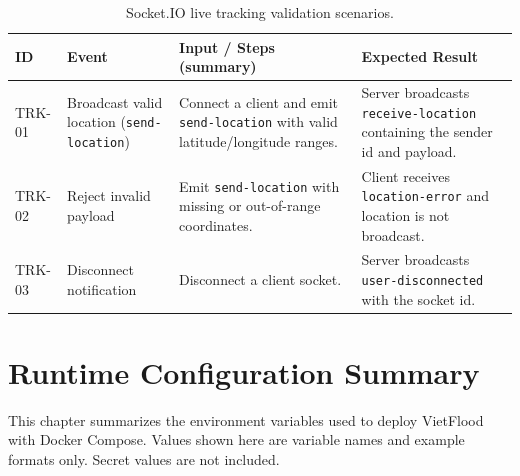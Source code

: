 \begin{table}[H]
\centering
\caption{Socket.IO live tracking validation scenarios.}
\label{tab:appendix-tracking-test-cases}
\renewcommand{\arraystretch}{1.15}
\scriptsize
\setlength{\tabcolsep}{3pt}
\begin{tabularx}{\textwidth}{|p{2.0cm}|p{3.8cm}|X|p{3.2cm}|}
\hline
\textbf{ID} & \textbf{Event} & \textbf{Input / Steps (summary)} & \textbf{Expected Result} \\
\hline
TRK-01 & Broadcast valid location (\texttt{send-location}) & Connect a client and emit \texttt{send-location} with valid latitude/longitude ranges. & Server broadcasts \texttt{receive-location} containing the sender id and payload. \\
\hline
TRK-02 & Reject invalid payload & Emit \texttt{send-location} with missing or out-of-range coordinates. & Client receives \texttt{location-error} and location is not broadcast. \\
\hline
TRK-03 & Disconnect notification & Disconnect a client socket. & Server broadcasts \texttt{user-disconnected} with the socket id. \\
\hline
\end{tabularx}
\end{table}

\chapter{Runtime Configuration Summary}

This chapter summarizes the environment variables used to deploy VietFlood with Docker Compose. Values shown here are variable names and example formats only. Secret values are not included.

